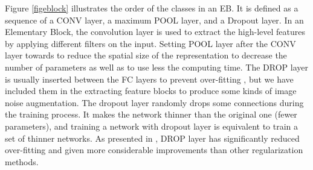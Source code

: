 \documentclass[review]{elsarticle}
\begin{document}
Figure \ref{figeblock} illustrates the order of the classes in an EB. It is defined as a sequence of a CONV layer, a maximum POOL layer, and a Dropout layer. In an Elementary Block, the convolution layer is used to extract the high-level features by applying different filters on the input. Setting POOL layer after the CONV layer towards to reduce the spatial size of the representation to decrease the number of parameters as well as to use less the computing time. The DROP layer is usually inserted between the FC layers to prevent over-fitting \cite{lecun2015deep, krizhevsky2012imagenet}, but we have included them in the extracting feature blocks to produce some kinds of image noise augmentation. The dropout layer randomly drops some connections during the training process. It makes the network thinner than the original one (fewer parameters), and training a network with dropout layer is equivalent to train a set of thinner networks. As presented in \cite{srivastava2014dropout}, DROP layer has significantly reduced over-fitting and given more considerable improvements than other regularization methods.
\end{document}
